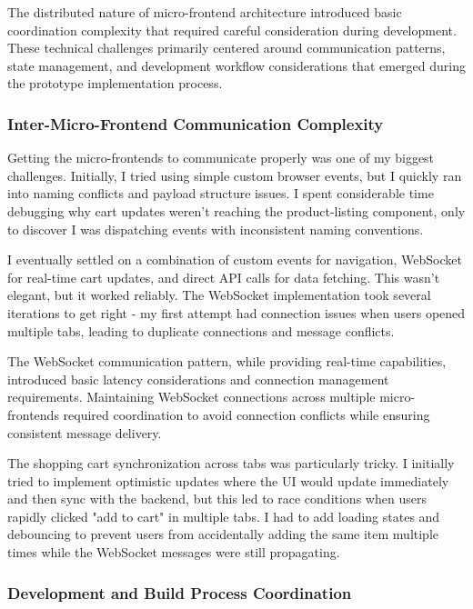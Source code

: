\documentclass[12pt,a4paper]{report}
\begin{document}
The distributed nature of micro-frontend architecture introduced basic coordination complexity that required careful consideration during development. These technical challenges primarily centered around communication patterns, state management, and development workflow considerations that emerged during the prototype implementation process.

\subsubsection{Inter-Micro-Frontend Communication Complexity}

Getting the micro-frontends to communicate properly was one of my biggest challenges. Initially, I tried using simple custom browser events, but I quickly ran into naming conflicts and payload structure issues. I spent considerable time debugging why cart updates weren't reaching the product-listing component, only to discover I was dispatching events with inconsistent naming conventions.

I eventually settled on a combination of custom events for navigation, WebSocket for real-time cart updates, and direct API calls for data fetching. This wasn't elegant, but it worked reliably. The WebSocket implementation took several iterations to get right - my first attempt had connection issues when users opened multiple tabs, leading to duplicate connections and message conflicts.

The WebSocket communication pattern, while providing real-time capabilities, introduced basic latency considerations and connection management requirements. Maintaining WebSocket connections across multiple micro-frontends required coordination to avoid connection conflicts while ensuring consistent message delivery.

The shopping cart synchronization across tabs was particularly tricky. I initially tried to implement optimistic updates where the UI would update immediately and then sync with the backend, but this led to race conditions when users rapidly clicked "add to cart" in multiple tabs. I had to add loading states and debouncing to prevent users from accidentally adding the same item multiple times while the WebSocket messages were still propagating.

\subsubsection{Development and Build Process Coordination}
\end{document}
